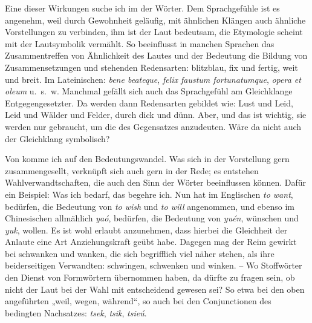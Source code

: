 {Eine dieser Wirkungen suche ich im  der Wörter. Dem Sprachgefühle ist es angenehm, weil durch Gewohnheit geläufig, mit ähnlichen Klängen auch ähnliche Vorstellungen zu verbinden, ihm ist der Laut bedeutsam, die Etymologie scheint mit der Lautsymbolik vermählt. So beeinflusst in manchen Sprachen das Zusammentreffen von Ähnlichkeit des Lautes und der Bedeutung die \label{fp.29} Bildung von Zusammensetzungen und stehenden Redensarten: blitzblau,  fix und fertig, weit und breit. Im Lateinischen: \textit{bene beateque}, \textit{felix faustum fortunatumque}, \textit{opera et oleum} u.~s.~w. Manchmal gefällt sich auch das Sprachgefühl am Gleichklange Entgegengesetzter. Da werden dann Redensarten gebildet wie: Lust und Leid, Leid und  Wälder und Felder, durch dick und dünn. Aber, und das ist wichtig, sie werden nur gebraucht, um die  des Gegensatzes anzudeuten. Wäre da nicht auch der Gleichklang symbolisch?


Von  komme ich auf den Bedeutungswandel. Was sich in der Vorstellung gern zusammengesellt, verknüpft sich auch gern in der Rede; es entstehen Wahlverwandtschaften, die auch den Sinn der Wörter beeinflussen können. Dafür ein Beispiel: Was ich bedarf, das begehre ich. Nun hat im Englischen \textit{to want}, bedürfen, die Bedeutung von \textit{to wish} und \textit{to will} angenommen, und ebenso im Chinesischen allmählich \textit{yaó}, bedürfen, die Bedeutung von \textit{yuén}, wünschen und \textit{yuk}, wollen. Es ist wohl erlaubt anzunehmen, dass hierbei die Gleichheit der Anlaute eine Art Anziehungskraft geübt habe. Dagegen mag der Reim gewirkt  bei schwanken und wanken, die sich begrifflich viel näher stehen, als ihre beiderseitigen Verwandten: schwingen, schwenken und winken. – Wo Stoffwörter den Dienst von Formwörtern übernommen haben, da dürfte zu fragen sein, ob nicht der Laut bei der Wahl mit entscheidend gewesen sei? So etwa bei den oben angeführten \label{fp.222} „weil, wegen, während“, so auch bei den  Conjunctionen des bedingten Nachsatzes: \textit{tsek}, \textit{tsik}, \textit{tsieú}.

}
